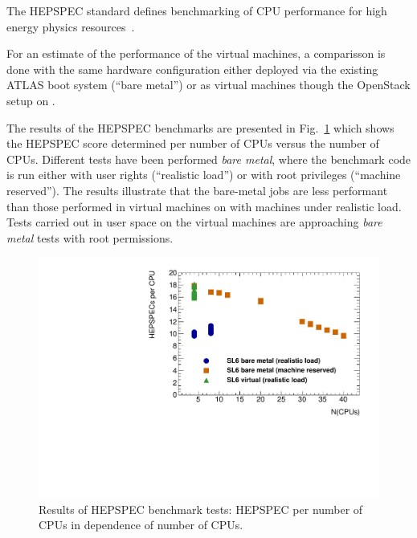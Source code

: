 The HEPSPEC standard defines benchmarking of CPU
performance for high energy physics resources~\cite{Hepspec}.




For an estimate of the performance of the virtual machines,
a comparisson is done with the same hardware configuration either
deployed via the existing ATLAS boot system (``bare metal'') or as virtual machines though the
OpenStack setup on \NEMO.

The results of the HEPSPEC benchmarks are presented in
Fig.~\ref{fig:HEPSPECpCPUvsCPU-atlas} which shows the HEPSPEC score
determined per number of CPUs versus the number of CPUs.
Different tests have been performed \textit{bare metal}, where the
benchmark code is run either with user rights (``realistic load'') or
with root privileges (``machine reserved'').
The results illustrate that the bare-metal jobs are less performant
than those performed in virtual machines on \NEMO with machines under
realistic load. Tests carried out
in user space on the virtual machines are approaching \textit{bare metal} tests with
root permissions.


\begin{figure}[htbp]
  \includegraphics[width=\columnwidth]{figures/HEPSPECpCPUvsCPU.pdf}
\caption{Results of HEPSPEC benchmark tests: HEPSPEC per number of
  CPUs in dependence of number of CPUs.}
\label{fig:HEPSPECpCPUvsCPU-atlas}
\end{figure}

